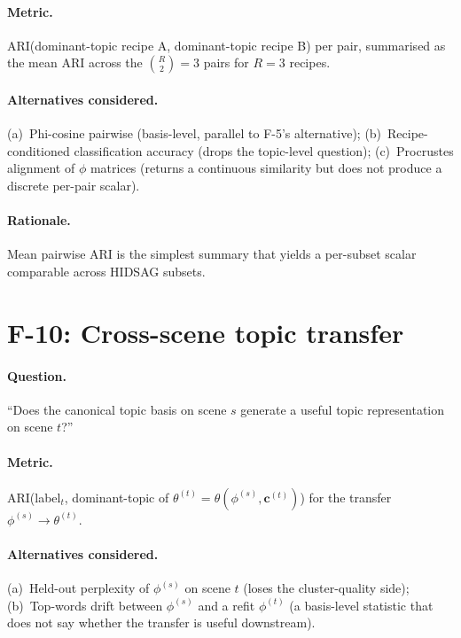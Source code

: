 \documentclass[11pt,a4paper]{article}
\begin{document}
\paragraph{Metric.} ARI(dominant-topic recipe A, dominant-topic
recipe B) per pair, summarised as the mean ARI across the
$\binom{R}{2} = 3$ pairs for $R = 3$ recipes.

\paragraph{Alternatives considered.} (a)~Phi-cosine pairwise
(basis-level, parallel to F-5's alternative); (b)~Recipe-conditioned
classification accuracy (drops the topic-level question);
(c)~Procrustes alignment of $\phi$ matrices (returns a continuous
similarity but does not produce a discrete per-pair scalar).

\paragraph{Rationale.} Mean pairwise ARI is the simplest summary
that yields a per-subset scalar comparable across HIDSAG subsets.

\section{F-10: Cross-scene topic transfer}

\paragraph{Question.} ``Does the canonical topic basis on scene $s$
generate a useful topic representation on scene $t$?''

\paragraph{Metric.} ARI(label$_t$, dominant-topic of $\theta^{(t)} =
\theta(\phi^{(s)}, \mathbf{c}^{(t)})$) for the transfer
$\phi^{(s)} \to \theta^{(t)}$.

\paragraph{Alternatives considered.} (a)~Held-out perplexity of
$\phi^{(s)}$ on scene $t$ (loses the cluster-quality side);
(b)~Top-words drift between $\phi^{(s)}$ and a refit
$\phi^{(t)}$ (a basis-level statistic that does not say whether the
transfer is useful downstream).
\end{document}
